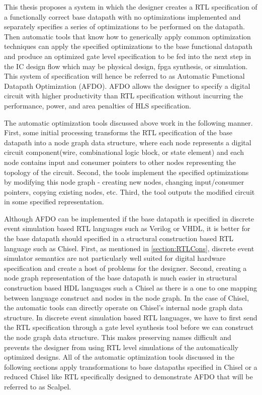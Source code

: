 This thesis proposes a system in which the designer creates a RTL specification of a functionally correct base datapath with no optimizations implemented and separately specifies a series of optimizations to be performed on the datapath. Then automatic tools that know how to generically apply common optimization techniques can apply the specified optimizations to the base functional datapath and produce an optimized gate level specification to be fed into the next step in the IC design flow which may be physical design, fpga synthesis, or simulation. This system of specification will hence be referred to as Automatic Functional Datapath Optimization (AFDO). AFDO allows the designer to specify a digital circuit with higher productivity than RTL specification without incurring the performance, power, and area penalties of HLS specification.

The automatic optimization tools discussed above work in the following manner. First, some initial processing transforms the RTL specification of the base datapath into a node graph data structure, where each node represents a digital circuit component(wire, combinational logic block, or state element) and each node contains input and consumer pointers to other nodes representing the topology of the circuit. Second, the tools implement the specified optimizations by modifying this node graph - creating new nodes, changing input/consumer pointers, copying existing nodes, etc. Third, the tool outputs the modified circuit in some specified representation.

Although AFDO can be implemented if the base datapath is specified in discrete event simulation based RTL languages such as Verilog or VHDL, it is better for the base datapath should specified in a structural construction based RTL language such as Chisel. First, as mentioned in \ref{section:RTLCons}, discrete event simulator semantics are not particularly well suited for digital hardware specification and create a host of problems for the designer. Second, creating a node graph representation of the base datapath is much easier in structural construction based HDL languages such a Chisel as there is a one to one mapping between language construct and nodes in the node graph. In the case of Chisel, the automatic tools can directly operate on Chisel’s internal node graph data structure. In discrete event simulation based RTL languages, we have to first send the RTL specification through a gate level synthesis tool before we can construct the node graph data structure. This makes preserving names difficult and prevents the designer from using RTL level simulations of the automatically optimized designs. All of the automatic optimization tools discussed in the following sections apply transformations to base datapaths specified in Chisel or a reduced Chisel like RTL specifically designed to demonstrate AFDO that will be referred to as Scalpel.

